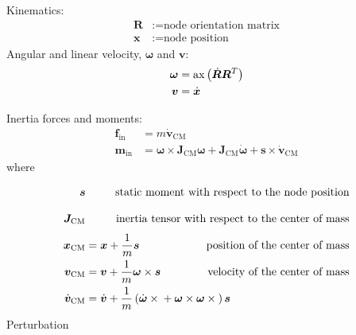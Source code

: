 \documentclass[10pt,fleqn,subeqn]{report}
\newcommand{\T}[1]{\bm{#1}}
\newcommand{\TT}[1]{\bm{#1}}
\begin{document}
Kinematics:
\begin{subequations}
\begin{align}
	\TT{R} &:= \text{node orientation matrix} \\
	\T{x} &:= \text{node position}
\end{align}
\end{subequations}
Angular and linear velocity, $\T{\omega}$ and $\T{v}$:
\begin{subequations}
\begin{align}
	\T{\omega} &= \mathrm{ax}\plbr{\dot{\TT{R}} \TT{R}^T} \\
	\T{v} &= \dot{\T{x}}
\end{align}
\end{subequations}

Inertia forces and moments:
\begin{subequations}
\begin{align}
	\T{f}_{\text{in}} &= m \dot{\T{v}}_{\text{CM}} \\
	\T{m}_{\text{in}} &=
	\T{\omega} \times \TT{J}_{\text{CM}} \T{\omega}
	+ \TT{J}_{\text{CM}} \dot{\T{\omega}}
	+ \T{s} \times \dot{\T{v}}_{\text{CM}}
\end{align}
\end{subequations}
where
\begin{subequations}
\begin{align}
	\T{s} & \vphantom{\frac{1}{m}}
		&\hspace{-40mm} \text{static moment with respect to the node position} \\
	\TT{J}_{\text{CM}} & \vphantom{\frac{1}{m}}
		&\hspace{-40mm} \text{inertia tensor with respect to the center of mass} \\
	\T{x}_{\text{CM}} &= \T{x} + \frac{1}{m} \T{s}
		&\hspace{-40mm} \text{position of the center of mass} \\
	\T{v}_{\text{CM}} &= \T{v} + \frac{1}{m} \T{\omega} \times \T{s}
		&\hspace{-40mm} \text{velocity of the center of mass} \\
	\dot{\T{v}}_{\text{CM}} &= \dot{\T{v}}
		+ \frac{1}{m}\plbr{
			\dot{\T{\omega}}\times{}
			+ \T{\omega}\times\T{\omega}\times{}
		} \T{s}
\end{align}
\end{subequations}
Perturbation
\end{document}
